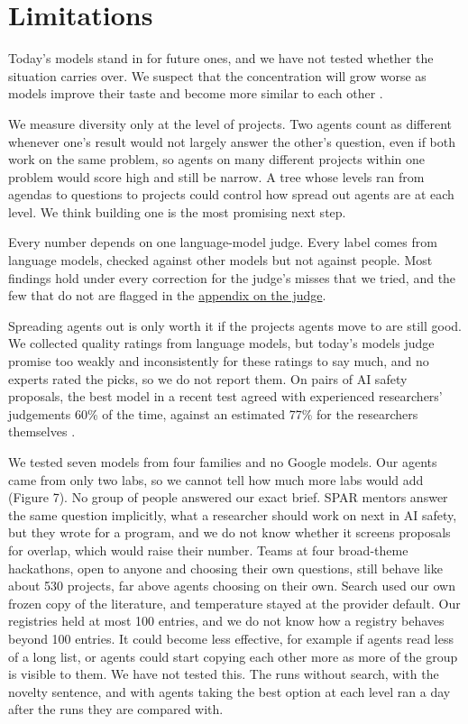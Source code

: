 \documentclass[11pt]{article}
\begin{document}
\section{Limitations}\label{limits}

Today's models stand in for future ones, and we have not tested whether
the situation carries over. We suspect that the concentration will grow
worse as models improve their taste and become more similar to each
other \citep{goel2025thinkalike}.

We measure diversity only at the level of projects. Two agents count as
different whenever one's result would not largely answer the other's
question, even if both work on the same problem, so agents on many
different projects within one problem would score high and still be
narrow. A tree whose levels ran from agendas to questions to projects
could control how spread out agents are at each level. We think building
one is the most promising next step.

Every number depends on one language-model judge. Every label comes from
language models, checked against other models but not against people.
Most findings hold under every correction for the judge's misses that we
tried, and the few that do not are flagged in the
\hyperref[appendix-the-judge-and-how-far-to-trust-it]{appendix on the
judge}.

Spreading agents out is only worth it if the projects agents move to are
still good. We collected quality ratings from language models, but
today's models judge promise too weakly and inconsistently for these
ratings to say much, and no experts rated the picks, so we do not report
them. On pairs of AI safety proposals, the best model in a recent test
agreed with experienced researchers' judgements 60\% of the time,
against an estimated 77\% for the researchers themselves
\citep{baig2026taste}.

We tested seven models from four families and no Google models. Our
agents came from only two labs, so we cannot tell how much more labs
would add (Figure 7). No group of people answered our exact brief. SPAR
mentors answer the same question implicitly, what a researcher should
work on next in AI safety, but they wrote for a program, and we do not
know whether it screens proposals for overlap, which would raise their
number. Teams at four broad-theme hackathons, open to anyone and
choosing their own questions, still behave like about 530 projects, far
above agents choosing on their own. Search used our own frozen copy of
the literature, and temperature stayed at the provider default. Our
registries held at most 100 entries, and we do not know how a registry
behaves beyond 100 entries. It could become less effective, for example
if agents read less of a long list, or agents could start copying each
other more as more of the group is visible to them. We have not tested
this. The runs without search, with the novelty sentence, and with
agents taking the best option at each level ran a day after the runs
they are compared with.
\end{document}
